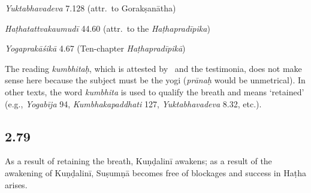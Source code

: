 \begin{ekdosis}
\begin{testimonia}[hp02_078]
\emph{Yuktabhavadeva} 7.128 (attr.~to Gorakṣanātha)

\begin{versinnote}
\end{versinnote}

\emph{Haṭhatattvakaumudī} 44.60 (attr.~to the \emph{Haṭhapradīpika})

\begin{versinnote}
\end{versinnote}

\emph{Yogaprakāśikā} 4.67 (Ten-chapter \emph{Haṭhapradīpikā})

\begin{versinnote}
\end{versinnote}
\end{testimonia}

\begin{philcomm}[hp02_078]
The reading \emph{kumbhitaḥ}, which is attested by \alphaOne\ and the testimonia, does not make sense here because the subject must be the yogi (\emph{prānaḥ} would be unmetrical). In other texts, the word \emph{kumbhita} is used to qualify the breath and means `retained' (e.g., \emph{Yogabīja} 94, \emph{Kumbhakapaddhati} 127, \emph{Yuktabhavadeva} 8.32, etc.).
\end{philcomm}

\subsection*{2.79}
\begin{translation}[hp02_079]
As a result of retaining the breath, Kuṇḍalinī awakens; as a result of the awakening of Kuṇḍalinī, Suṣumṇā becomes free of blockages and success in Haṭha arises.
\end{translation}


\end{ekdosis}

